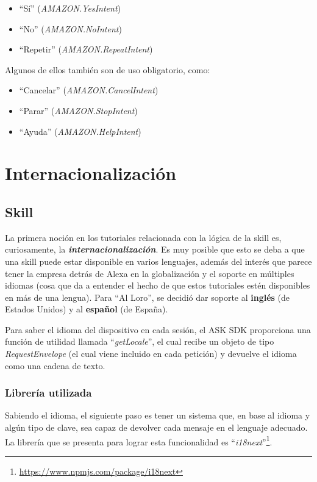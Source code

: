 \documentclass[11pt,spanish,listoffigures,listoftables,table,hyphens,dvipsnames]{tfgetsinf}
\begin{document}
\begin{itemize}
   \item ``Sí'' (\textit{AMAZON.YesIntent})
   \item ``No'' (\textit{AMAZON.NoIntent})
   \item ``Repetir'' (\textit{AMAZON.RepeatIntent})
\end{itemize}

Algunos de ellos también son de uso obligatorio, como:

\begin{itemize}
   \item ``Cancelar'' (\textit{AMAZON.CancelIntent})
   \item ``Parar'' (\textit{AMAZON.StopIntent})
   \item ``Ayuda'' (\textit{AMAZON.HelpIntent})
\end{itemize}

\section{Internacionalización}
\label{seccion:internacionalizacion}

\subsection{Skill}

La primera noción en los tutoriales relacionada con la lógica de la skill es, curiosamente, la \textbf{\emph{internacionalización}}. Es muy posible que esto se deba a que una skill puede estar disponible en varios lenguajes, además del interés que parece tener la empresa detrás de Alexa en la globalización y el soporte en múltiples idiomas (cosa que da a entender el hecho de que estos tutoriales estén disponibles en más de una lengua). Para ``Al Loro'', se decidió dar soporte al \textbf{inglés} (de Estados Unidos) y al \textbf{español} (de España).

Para saber el idioma del dispositivo en cada sesión, el ASK SDK proporciona una función de utilidad llamada ``\emph{getLocale}'', el cual recibe un objeto de tipo \emph{RequestEnvelope} (el cual viene incluido en cada petición) y devuelve el idioma como una cadena de texto.

\subsubsection{Librería utilizada}

Sabiendo el idioma, el siguiente paso es tener un sistema que, en base al idioma y algún tipo de clave, sea capaz de devolver cada mensaje en el lenguaje adecuado. La librería que se presenta para lograr esta funcionalidad es ``\emph{i18next}''\footnote{\url{https://www.npmjs.com/package/i18next}}.
\end{document}

